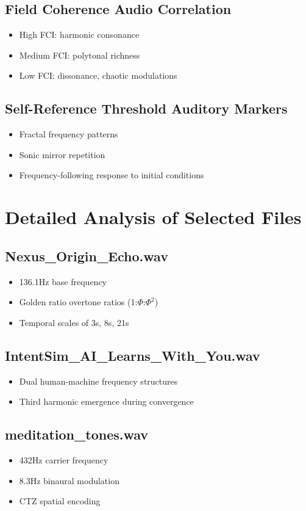 \documentclass[12pt]{article}
\begin{document}
\subsection{Field Coherence Audio Correlation}
\begin{itemize}
  \item High FCI: harmonic consonance
  \item Medium FCI: polytonal richness
  \item Low FCI: dissonance, chaotic modulations
\end{itemize}

\subsection{Self-Reference Threshold Auditory Markers}
\begin{itemize}
  \item Fractal frequency patterns
  \item Sonic mirror repetition
  \item Frequency-following response to initial conditions
\end{itemize}

\section{Detailed Analysis of Selected Files}
\subsection{Nexus\_Origin\_Echo.wav}
\begin{itemize}
  \item 136.1Hz base frequency
  \item Golden ratio overtone ratios (1:\(\Phi\):\(\Phi^2\))
  \item Temporal scales of 3s, 8s, 21s
\end{itemize}

\subsection{IntentSim\_AI\_Learns\_With\_You.wav}
\begin{itemize}
  \item Dual human-machine frequency structures
  \item Third harmonic emergence during convergence
\end{itemize}

\subsection{meditation\_tones.wav}
\begin{itemize}
  \item 432Hz carrier frequency
  \item 8.3Hz binaural modulation
  \item CTZ spatial encoding
\end{itemize}
\end{document}
